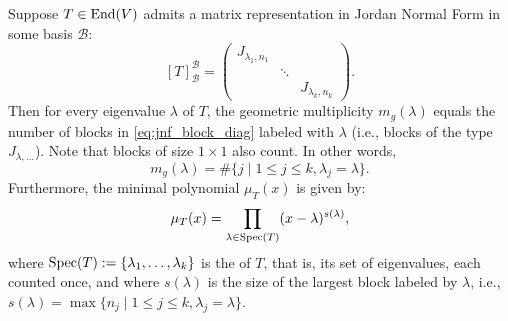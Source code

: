 \begin{corollary}
\label{cor:multiplicities_min_poly_jnf}
Suppose $T \in \operatorname{End}(V)$ admits a matrix representation in Jordan Normal Form in some basis $\mathcal{B}$:
\begin{equation}
\label{eq:jnf_block_diag}
[T]_{\mathcal{B}}^{\mathcal{B}} = \begin{pmatrix} J_{\lambda_1, n_1} & & \\ & \ddots & \\ & & J_{\lambda_k, n_k} \end{pmatrix}.
\end{equation}
Then for every eigenvalue $\lambda$ of $T$, the geometric multiplicity $m_g(\lambda)$ equals the number of blocks in \eqref{eq:jnf_block_diag} labeled with $\lambda$ (i.e., blocks of the type $J_{\lambda, \dots}$). Note that blocks of size $1 \times 1$ also count. In other words,
\[
m_g(\lambda) = \# \{ j \mid 1 \le j \le k, \lambda_j = \lambda \}.
\]
Furthermore, the minimal polynomial $\mu_T(x)$ is given by:
\[
\mu_T(x) = \prod_{\lambda \in \operatorname{Spec}(T)} (x - \lambda)^{s(\lambda)},
\]
where $\operatorname{Spec}(T) := \{ \lambda_1, \dots, \lambda_k \}$ is the  of $T$, that is, its set of eigenvalues, each counted once, and where $s(\lambda)$ is the size of the largest block labeled by $\lambda$, i.e., $s(\lambda) = \max \{ n_j \mid 1 \le j \le k, \lambda_j = \lambda \}$.
\end{corollary}

